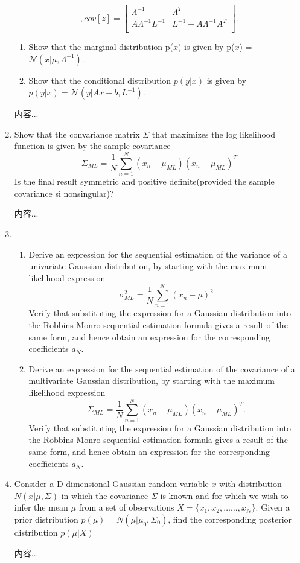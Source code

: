 \documentclass[a4paper]{article}
\begin{document}
\begin{enumerate}
$$		,
		cov[z]=\begin{bmatrix}
		\Lambda^{-1} & \Lambda^{T} \\
		A\Lambda^{-1}L^{-1} & L^{-1} + A\Lambda^{-1}A^{T}\\
		\end{bmatrix}
		.
		$$
		\begin{enumerate}
			\item
			Show that the marginal distribution p($x$) is given by p($x$) = $\mathcal{N}(x|\mu,\Lambda^{-1})$.
			\item
			Show that the conditional distribution $p(y|x)$ is given by $p(y|x)=\mathcal{N}(y|Ax + b,L^{-1})$.
		\end{enumerate}
		\begin{solution}
			内容...
		\end{solution}
		
		\item
		Show that the convariance matrix $\Sigma$ that maximizes the log likelihood function is given by the sample covariance
		$$
		\Sigma_{ML}=\frac{1}{N}\sum_{n=1}^{N}(x_n - \mu_{ML})(x_n - \mu_{ML})^{T}
		$$
		Is the final result symmetric and positive definite(provided the sample covariance si nonsingular)?
		\begin{solution}
			内容...
		\end{solution}
		
		\item
		\begin{enumerate}
			\item
			Derive an expression for the sequential estimation of the variance of a univariate Gaussian distribution, by starting with the maximum likelihood expression
			$$
			\sigma_{ML}^2 = \frac{1}{N}\sum_{n=1}^{N}(x_n - \mu)^2
			$$
			Verify that substituting the expression for a Gaussian distribution into the Robbins-Monro sequential estimation formula gives a result of the same form, and hence obtain an expression for the corresponding coefficients $a_N$.
			\item
			Derive an expression for the sequential estimation of the covariance of a multivariate Gaussian distribution, by starting with the maximum likelihood expression
			$$
			\Sigma_{ML}=\frac{1}{N}\sum_{n=1}^{N}(x_n-\mu_{ML})(x_n-\mu_{ML})^{T}.
			$$
			Verify that substituting the expression for a Gaussian distribution into the Robbins-Monro sequential estimation formula gives a result of the same form, and hence obtain an expression for the corresponding coefficients $a_N$.
		\end{enumerate}
		\item
		Consider a D-dimensional Gaussian random variable $x$ with distribution $N(x|\mu,\Sigma)$ in which the covariance $\Sigma$ is known and for which we wish to infer the mean $\mu$ from a set of observations $X=\{x_1,x_2,……,x_N\}$. Given a prior distribution $p(\mu)=N(\mu|\mu_0,\Sigma_0)$, find the corresponding posterior distribution $p(\mu|X)$
		\begin{solution}
			内容...
		\end{solution}
		
	\end{enumerate}
\end{document}
